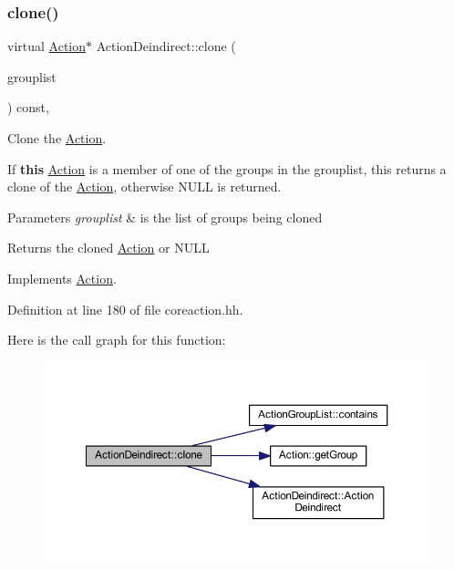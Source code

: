 \subsubsection{\texorpdfstring{clone()}{clone()}}
{\footnotesize\ttfamily virtual \mbox{\hyperlink{class_action}{Action}}$\ast$ Action\+Deindirect\+::clone (\begin{DoxyParamCaption}\item[{const \mbox{\hyperlink{class_action_group_list}{Action\+Group\+List}} \&}]{grouplist }\end{DoxyParamCaption}) const\hspace{0.3cm}{\ttfamily [inline]}, {\ttfamily [virtual]}}



Clone the \mbox{\hyperlink{class_action}{Action}}. 

If {\bfseries{this}} \mbox{\hyperlink{class_action}{Action}} is a member of one of the groups in the grouplist, this returns a clone of the \mbox{\hyperlink{class_action}{Action}}, otherwise N\+U\+LL is returned. 
\begin{DoxyParams}{Parameters}
{\em grouplist} & is the list of groups being cloned \\
\hline
\end{DoxyParams}
\begin{DoxyReturn}{Returns}
the cloned \mbox{\hyperlink{class_action}{Action}} or N\+U\+LL 
\end{DoxyReturn}


Implements \mbox{\hyperlink{class_action_af8242e41d09e5df52f97df9e65cc626f}{Action}}.



Definition at line 180 of file coreaction.\+hh.

Here is the call graph for this function\+:
\nopagebreak
\begin{figure}[H]
\begin{center}
\leavevmode
\includegraphics[width=350pt]{class_action_deindirect_ae0d7981c40e1af3c554a2229dc8c44ab_cgraph}
\end{center}
\end{figure}


